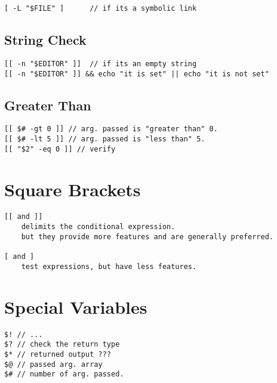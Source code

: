 \begin{verbatim}
[ -L "$FILE" ]      // if its a symbolic link 
\end{verbatim}

\subsection{String Check}

\begin{verbatim}
[[ -n "$EDITOR" ]]  // if its an empty string
[[ -n "$EDITOR" ]] && echo "it is set" || echo "it is not set"
\end{verbatim}

\subsection{Greater Than}

\begin{verbatim}
[[ $# -gt 0 ]] // arg. passed is "greater than" 0.
[[ $# -lt 5 ]] // arg. passed is "less than" 5.
[[ "$2" -eq 0 ]] // verify 
\end{verbatim}

\section{Square Brackets}

\begin{verbatim}
[[ and ]] 
    delimits the conditional expression. 
    but they provide more features and are generally preferred.

[ and ]
    test expressions, but have less features.
\end{verbatim}

\section{Special Variables}

\begin{verbatim}
$! // ... 
$? // check the return type
$* // returned output ???
$@ // passed arg. array 
$# // number of arg. passed.
\end{verbatim}

